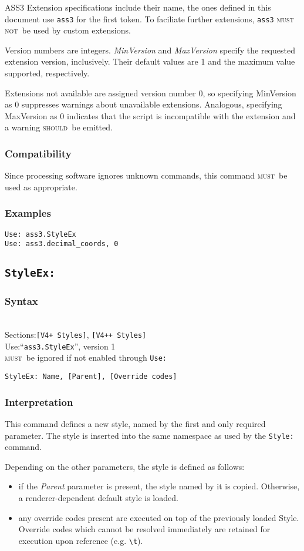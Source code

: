 \documentclass[11pt,a4paper]{article}
\newcommand{\should}{\textsc{should}}
\newcommand{\must}{\textsc{must}}
\newcommand{\mustnot}{\textsc{must not}}
\newcommand{\syntax}[1]{
	\subsubsection*{Syntax}
	\begin{tabbing}
	\hspace{2cm}\=\\[-16pt]
	#1
	\end{tabbing}
}
\newcommand{\mustuse}{\must\ be ignored if not enabled through \texttt{Use:}}
\newcommand{\secspecs}[2]{Sections:\>\texttt{#1}, \texttt{#2}}
\newcommand{\usespec}[3]{Use:\>``\texttt{#1}'', version #2\\\> #3}
\begin{document}
ASS3 Extension specifications include their name, the ones defined in this
document use \texttt{ass3} for the first token. To faciliate further
extensions, \texttt{ass3} \mustnot\ be used by custom extensions.

Version numbers are integers. \emph{MinVersion} and \emph{MaxVersion}
specify the requested extension version, inclusively. Their default
values are 1 and the maximum value supported, respectively.

Extensions not available are assigned version number 0, so specifying
MinVersion as 0 suppresses warnings about unavailable extensions.
Analogous, specifying MaxVersion as 0 indicates that the script
is incompatible with the extension and a warning \should\ be emitted.

\subsubsection*{Compatibility}
Since processing software ignores unknown commands, this command
\must\ be used as appropriate.

\subsubsection*{Examples}
\begin{verbatim}
Use: ass3.StyleEx
Use: ass3.decimal_coords, 0
\end{verbatim}

\newpage
\subsection{\texttt{StyleEx:}}
\syntax{
	\secspecs{[V4+ Styles]}{[V4++ Styles]}\\
	\usespec{ass3.StyleEx}{1}{\mustuse}
}

\begin{verbatim}
StyleEx: Name, [Parent], [Override codes]
\end{verbatim}

\subsubsection*{Interpretation}
This command defines a new style, named by the first and only required
parameter. The style is inserted into the same namespace as used by the
\verb!Style:! command.

Depending on the other parameters, the style is defined as follows:
\begin{itemize}
\item if the \emph{Parent} parameter is present, the style named by it is
copied. Otherwise, a renderer-dependent default style is loaded.
\item any override codes present are executed on top of the previously
loaded Style. Override codes which cannot be resolved immediately are
retained for execution upon reference (e.g. \verb!\t!).
\end{itemize}
\end{document}
